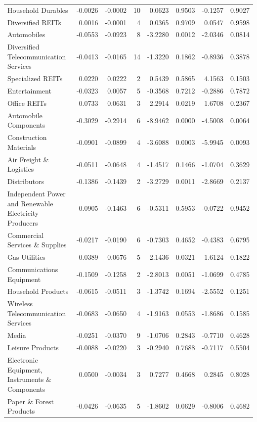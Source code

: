 \begin{table}
\begin{tabular}{lrrrrrrr}
Household Durables & -0.0026 & -0.0002 & 10 & 0.0623 & 0.9503 & -0.1257 & 0.9027 \\
Diversified REITs & 0.0016 & -0.0001 & 4 & 0.0365 & 0.9709 & 0.0547 & 0.9598 \\
Automobiles & -0.0553 & -0.0923 & 8 & -3.2280 & 0.0012 & -2.0346 & 0.0814 \\
Diversified Telecommunication Services & -0.0413 & -0.0165 & 14 & -1.3220 & 0.1862 & -0.8936 & 0.3878 \\
Specialized REITs & 0.0220 & 0.0222 & 2 & 0.5439 & 0.5865 & 4.1563 & 0.1503 \\
Entertainment & -0.0323 & 0.0057 & 5 & -0.3568 & 0.7212 & -0.2886 & 0.7872 \\
Office REITs & 0.0733 & 0.0631 & 3 & 2.2914 & 0.0219 & 1.6708 & 0.2367 \\
Automobile Components & -0.3029 & -0.2914 & 6 & -8.9462 & 0.0000 & -4.5008 & 0.0064 \\
Construction Materials & -0.0901 & -0.0899 & 4 & -3.6088 & 0.0003 & -5.9945 & 0.0093 \\
Air Freight \& Logistics & -0.0511 & -0.0648 & 4 & -1.4517 & 0.1466 & -1.0704 & 0.3629 \\
Distributors & -0.1386 & -0.1439 & 2 & -3.2729 & 0.0011 & -2.8669 & 0.2137 \\
Independent Power and Renewable Electricity Producers & 0.0905 & -0.1463 & 6 & -0.5311 & 0.5953 & -0.0722 & 0.9452 \\
Commercial Services \& Supplies & -0.0217 & -0.0190 & 6 & -0.7303 & 0.4652 & -0.4383 & 0.6795 \\
Gas Utilities & 0.0389 & 0.0676 & 5 & 2.1436 & 0.0321 & 1.6124 & 0.1822 \\
Communications Equipment & -0.1509 & -0.1258 & 2 & -2.8013 & 0.0051 & -1.0699 & 0.4785 \\
Household Products & -0.0615 & -0.0511 & 3 & -1.3742 & 0.1694 & -2.5552 & 0.1251 \\
Wireless Telecommunication Services & -0.0683 & -0.0650 & 4 & -1.9163 & 0.0553 & -1.8686 & 0.1585 \\
Media & -0.0251 & -0.0370 & 9 & -1.0706 & 0.2843 & -0.7710 & 0.4628 \\
Leisure Products & -0.0088 & -0.0220 & 3 & -0.2940 & 0.7688 & -0.7117 & 0.5504 \\
Electronic Equipment, Instruments \& Components & 0.0500 & -0.0034 & 3 & 0.7277 & 0.4668 & 0.2845 & 0.8028 \\
Paper \& Forest Products & -0.0426 & -0.0635 & 5 & -1.8602 & 0.0629 & -0.8006 & 0.4682 \\

\end{tabular}
\end{table}
